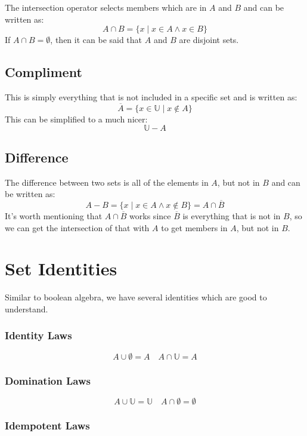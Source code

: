 The intersection operator selects members which are in \(A\) and \(B\) and can be written as:
\[
    A \cap B = \{x \mid x \in A \land x \in B\}
\]
If \(A \cap B= \emptyset\), then it can be said that \(A\) and \(B\) are disjoint sets.

\subsection{Compliment}\label{sub:compliment}

This is simply everything that is not included in a specific set and is written as:
\[
    \overline{A}=\{x \in \mathbb{U} \mid x \notin A\}
\]
This can be simplified to a much nicer:
\[
    \mathbb{U}-A
\]

\subsection{Difference}\label{sub:differencepafour}

The difference between two sets is all of the elements in \(A\), but not in \(B\) and can be written as:
\[
    A-B = \{x \mid x \in A \land x \notin B\} = A \cap \overline{B}
\]
It's worth mentioning that \(A \cap \overline{B}\) works since \(\overline{B}\) is everything that is not in \(B\), so we can get the intersection of that with \(A\) to get members in \(A\), but not in \(B\).

\section{Set Identities}\label{sec:set_identities}

Similar to boolean algebra, we have several identities which are good to understand.

\subsubsection{Identity Laws}\label{ssub:identity_laws}

\[
    A \cup \emptyset = A \quad A \cap \mathbb{U} = A
\]

\subsubsection{Domination Laws}\label{ssub:domination_laws}

\[
    A \cup \mathbb{U} = \mathbb{U} \quad A \cap \emptyset = \emptyset
\]

\subsubsection{Idempotent Laws}\label{ssub:idempotent_laws}


